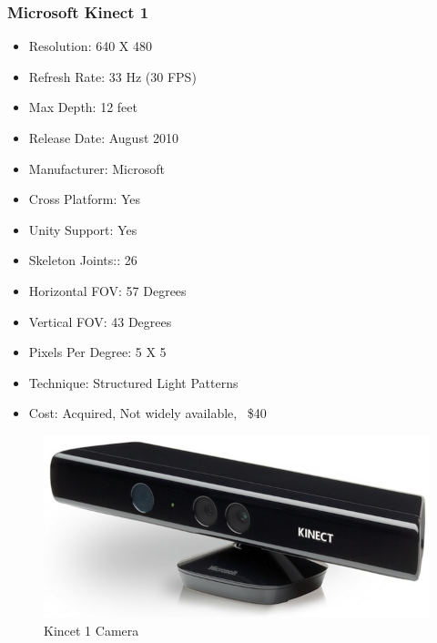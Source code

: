 \documentclass[a4paper,10pt,twoside]{article}
\begin{document}
\subsubsection{Microsoft Kinect 1}
\begin{itemize}
  \item Resolution: 640 X 480
  \item Refresh Rate: 33 Hz (30 FPS)
  \item Max Depth: 12 feet
  \item Release Date: August 2010 
  \item Manufacturer: Microsoft
  \item Cross Platform: Yes
  \item Unity Support: Yes
  \item Skeleton Joints:: 26
  \item Horizontal FOV: 57 Degrees
  \item Vertical FOV: 43 Degrees
  \item Pixels Per Degree: 5 X 5
  \item Technique: Structured Light Patterns
  \item Cost: Acquired, Not widely available, ~\$40
\end{itemize}
\begin{figure}[H]
	\includegraphics[width=\linewidth,height=\paperheight,keepaspectratio]{kinect1.jpg}
	\caption{Kincet 1 Camera}
	\label{fig:k1Cam}
	\end{figure}
	\pagebreak
\end{document}
